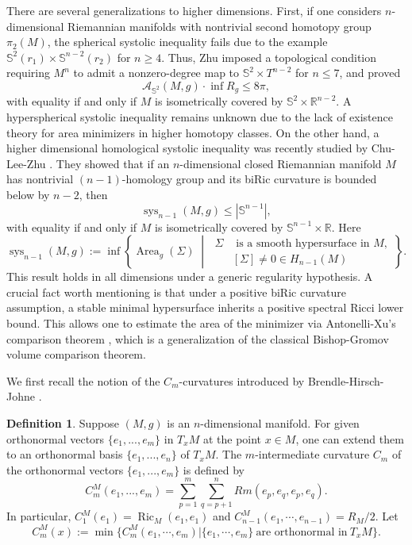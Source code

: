 \documentclass[11pt]{amsart}
\DeclareMathOperator{\Ric}{Ric}
\theoremstyle{definition}
\newtheorem{definition}[theorem]{Definition}
\theoremstyle{remark}
\numberwithin{equation}{section}
\begin{document}
There are several generalizations to higher dimensions. First, if one considers $n$-dimensional
  Riemannian manifolds with nontrivial second homotopy group $\pi_2(M)$, the spherical systolic
  inequality fails due to the example $\mathbb{S}^2(r_1)\times \mathbb{S}^{n-2}(r_2)$ for $n\geq 4$.
   Thus,
  Zhu \cite{zhu-spherical-systole-dimension-two} imposed a topological condition  requiring $M^n$
  to admit a nonzero-degree map to $\mathbb{S}^2\times T^{n-2}$ for $n\leq 7$, and proved
\[\mathcal{A}_{\mathbb{S}^2}(M, g) \cdot \inf R_g\leq 8\pi,\]
with equality if and only if $M$ is isometrically covered by $\mathbb{S}^2\times \mathbb{R}^{n-2}.$
  A hyperspherical systolic inequality remains unknown due to the lack of existence theory for area
  minimizers in higher homotopy classes. On the other hand, a higher dimensional homological
  systolic inequality was recently studied by Chu-Lee-Zhu \cite{chuleezhu_n_systole}. They showed
  that if an $n$-dimensional closed Riemannian manifold $M$ has nontrivial $(n-1)$-homology group
  and its biRic curvature is bounded below by $n-2$, then
\[\operatorname{sys}_{n-1}(M,g)\leq |\mathbb{S}^{n-1}|,\]
with equality if and only if $M$ is isometrically covered by $\mathbb{S}^{n-1}\times \mathbb{R}$.
  Here 
\begin{equation*}
    \operatorname{sys}_{n-1}(M, g) := \inf \left\{ \operatorname{Area}_g(\Sigma) \;\middle|\;
\begin{aligned}
\Sigma  &\text{ is a smooth hypersurface in } M, \\
&[\Sigma] \neq 0 \in H_{n-1}(M)
\end{aligned} \right\}.
\end{equation*}
This result holds in all dimensions under a generic regularity hypothesis. A crucial fact
  worth mentioning is that under a positive biRic curvature assumption, a stable minimal
  hypersurface inherits a positive spectral Ricci lower bound. 
  This allows one to estimate the area of the minimizer via Antonelli-Xu's comparison theorem
  \cite{antonelli-xu}, which is a generalization of the classical Bishop-Gromov volume comparison
  theorem. 

We first recall the notion of the $C_m$-curvatures introduced by Brendle-Hirsch-Johne
  \cite{brendlegeroch'sconjecture}. 

\begin{definition}

    Suppose $(M,g)$ is an $n$-dimensional manifold. For given orthonormal vectors
      $\{e_{1},...,e_{m}\}$ in $T_xM$ at the point $x\in M$, one can extend them to an orthonormal
      basis $\{e_{1},...,e_{n}\}$ of $T_{x}M$. 
    The $m$-intermediate curvature $C_{m}$ of the orthonormal vectors $\{e_{1},...,e_{m}\}$ is
      defined by 
    \[
    C^M_{m}(e_{1},...,e_{m}) = \sum_{p=1}^{m}\sum_{q=p+1}^{n}Rm(e_{p},e_{q},e_{p},e_{q}).\]
In particular, $C^M_1(e_1)=\Ric_M(e_1,e_1)$ and $C^M_{n-1}(e_1,\cdots,e_{n-1})=R_M/2.$
   Let 
\[C^M_m(x):=\min\{C^M_m(e_1,\cdots,e_m)| \{e_1,\cdots,e_m\}\ \text{are orthonormal in}\ T_xM\}.\]
\end{definition}
\end{document}

